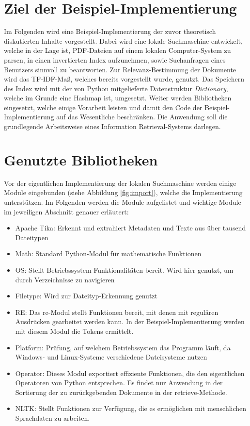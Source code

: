 \section{Ziel der Beispiel-Implementierung}\label{ziel-der-beispiel-implementierung}

Im Folgenden wird eine Beispiel-Implementierung der zuvor theoretisch diskutierten Inhalte vorgestellt. Dabei wird eine lokale Suchmaschine entwickelt, welche in der Lage ist, PDF-Dateien auf einem lokalen Computer-System zu parsen, in einen invertierten Index aufzunehmen, sowie Suchanfragen eines Benutzers sinnvoll zu beantworten. Zur Relevanz-Bestimmung der Dokumente wird das TF-IDF-Maß, welches bereits vorgestellt wurde, genutzt. Das Speichern des Index wird mit der von Python mitgelieferte Datenstruktur \textit{Dictionary}, welche im Grunde eine Hashmap ist, umgesetzt. Weiter werden Bibliotheken eingesetzt, welche einige Vorarbeit leisten und damit den Code der Beispiel-Implementierung auf das Wesentliche beschränken. Die Anwendung soll die grundlegende Arbeitsweise eines Information Retrieval-Systems darlegen.

\section{Genutzte Bibliotheken}\label{genutzte-bibliotheken}

Vor der eigentlichen Implementierung der lokalen Suchmaschine werden einige Module eingebunden (siehe Abbildung \ref{fig:import}), welche die Implementierung unterstützen. Im Folgenden werden die Module aufgelistet und wichtige Module im jeweiligen Abschnitt genauer erläutert:\newpage
\begin{itemize}
	\item Apache Tika: Erkennt und extrahiert Metadaten und Texte aus über tausend Dateitypen \cite{Apache_Tika}
	\item Math: Standard Python-Modul für mathematische Funktionen
	\item OS: Stellt Betriebssystem-Funktionalitäten bereit. Wird hier genutzt, um durch Verzeichnisse zu navigieren
	\item Filetype: Wird zur Dateityp-Erkennung genutzt \cite{filetype}
	\item RE: Das re-Modul stellt Funktionen bereit, mit denen mit regulären Ausdrücken gearbeitet werden kann. In der Beispiel-Implementierung werden mit diesem Modul die Tokens ermittelt. \cite{python_re}
	\item Platform: Prüfung, auf welchem Betriebssystem das Programm läuft, da Windows- und Linux-Systeme verschiedene Dateisysteme nutzen
	\item Operator: Dieses Modul exportiert effiziente Funktionen, die den eigentlichen Operatoren von Python entsprechen. Es findet nur Anwendung in der Sortierung der zu zurückgebenden Dokumente in der retrieve-Methode.
	\item NLTK: Stellt Funktionen zur Verfügung, die es ermöglichen mit menschlichen Sprachdaten zu arbeiten.
\end{itemize}

